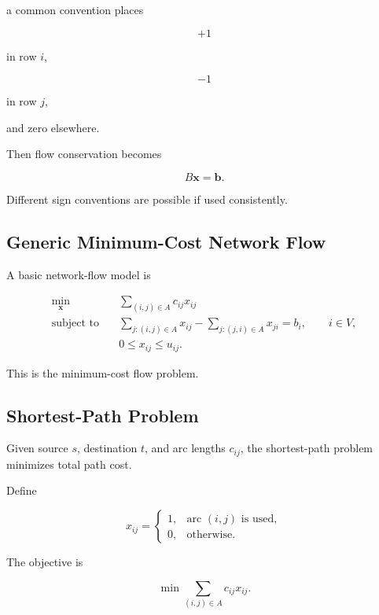 a common convention places

\[
\boxed{
+1
}
\]

in row \(i\),

\[
\boxed{
-1
}
\]

in row \(j\),

and zero elsewhere.

Then flow conservation becomes

\[
\boxed{
B\mathbf{x}
=
\mathbf{b}.
}
\]

Different sign conventions are possible if used consistently.

\subsection{Generic Minimum-Cost Network Flow}
\label{subsec:generic-minimum-cost-network-flow}

A basic network-flow model is

\[
\boxed{
\begin{aligned}
\min_{\mathbf{x}}
\quad&
\sum_{(i,j)\in A}
c_{ij}x_{ij}
\\
\text{subject to}
\quad&
\sum_{j:(i,j)\in A}
x_{ij}
-
\sum_{j:(j,i)\in A}
x_{ji}
=
b_i,
\qquad
i\in V,
\\
&
0\leq x_{ij}\leq u_{ij}.
\end{aligned}
}
\]

This is the minimum-cost flow problem.

\subsection{Shortest-Path Problem}
\label{subsec:network-shortest-path}

Given source \(s\), destination \(t\), and arc lengths \(c_{ij}\), the
shortest-path problem minimizes total path cost.

Define

\[
x_{ij}
=
\begin{cases}
1,
&
\text{arc }(i,j)\text{ is used},
\\
0,
&
\text{otherwise}.
\end{cases}
\]

The objective is

\[
\boxed{
\min
\sum_{(i,j)\in A}
c_{ij}x_{ij}.
}
\]


